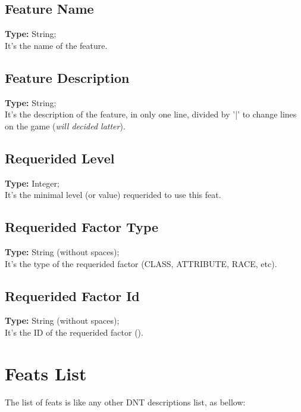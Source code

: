 \documentclass[letterpaper,12pt]{article}
\begin{document}
\subsection{Feature Name}
{\bf Type:} String;\\
It's the name of the feature.

\subsection{Feature Description}
{\bf Type:} String;\\
It's the description of the feature, in only one line, divided by '|' to change lines on the game ({\it will decided latter}).

\subsection{Requerided Level}
{\bf Type:} Integer;\\
It's the minimal level (or value) requerided to use this feat.

\subsection{Requerided Factor Type}
{\bf Type:} String (without spaces);\\
It's the type of the requerided factor (CLASS, ATTRIBUTE, RACE, etc).

\subsection{Requerided Factor Id}
{\bf Type:} String (without spaces);\\
It's the ID of the requerided factor ().


\section{Feats List}

The list of feats is like any other DNT descriptions list, as bellow:
\end{document}
